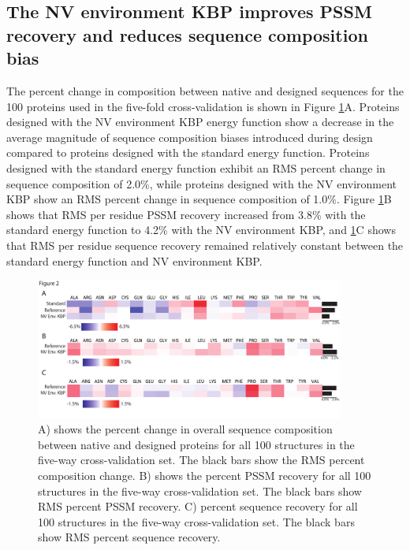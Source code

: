 \subsection{The \ac{NV} environment \ac{KBP} improves PSSM recovery and reduces sequence composition bias}
The percent change in composition between native and designed sequences for the 100 proteins used in the five-fold cross-validation is shown in Figure \ref{fig:overall_crossval_changes}A.
Proteins designed with the \ac{NV} environment \ac{KBP} energy function show a decrease in the average magnitude of sequence composition biases introduced during design compared to proteins designed with the standard energy function.
Proteins designed with the standard energy function exhibit an \ac{RMS} percent change in sequence composition of 2.0\%, while proteins designed with the \ac{NV} environment \ac{KBP} show an \ac{RMS} percent change in sequence composition of 1.0\%.
Figure \ref{fig:overall_crossval_changes}B shows that \ac{RMS} per residue \ac{PSSM} recovery increased from 3.8\% with the standard energy function to 4.2\% with the \ac{NV} environment \ac{KBP}, and \ref{fig:overall_crossval_changes}C shows that \ac{RMS} per residue sequence recovery remained relatively constant between the standard energy function and \ac{NV} environment \ac{KBP}. 

\begin{figure}
\centering
\includegraphics[width=4in]{figures/nv_kbp/overall_crossval_changes}
\caption{
A) shows the percent change in overall sequence composition between native and designed proteins for all 100 structures in the five-way cross-validation set.
The black bars show the \acs{RMS} percent composition change.
B) shows the percent \acs{PSSM} recovery for all 100 structures in the five-way cross-validation set.  The black bars show \acs{RMS} percent \acs{PSSM} recovery.
C) percent sequence recovery for all 100 structures in the five-way cross-validation set.  The black bars show \acs{RMS} percent sequence recovery.	
}
\label{fig:overall_crossval_changes}
\end{figure}


